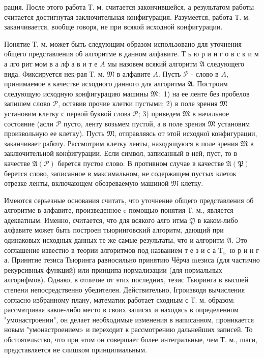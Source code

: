 \documentclass[10pt]{article}
\begin{document}
рация. После этого работа Т. м. считается закончившейся, а результатом работы считается достигнутая заключительная конфигурация. Разумеется, работа Т. м. заканчивается, вообще говоря, не при всякой исходной конфигурации.



Понятие Т. м. может быть следующим образом использовано для уточнения общего представления об алгоритме в данном алфавите. Т ь ю р и н г о в с к и м а лго рит мом в а лф а в и т е $A$ мы назовем всякий алгоритм $\mathfrak{A}$ следующего вида. Фиксируется нек-рая Т. м. $\mathfrak{M}$ в алфавите $A$. Пусть $\mathscr{P}$ - слово в $A$, принимаемое в качестве исходного данного для алгоритма $\mathfrak{A}$. Построим следующую исходную конфигурацию машины $\mathfrak{M}:$ 1) на ее ленте без пробелов запишем слово $\mathscr{P}$, оставив прочие клетки пустыми; 2) в поле зрения $\mathfrak{M}$ установим клетку с первой буквой слова $\mathscr{P}$; 3) приведем $\mathfrak{M}$ в начальное состояние (асли $\mathscr{P}$ пусто, ленту возьмем пустой, а в поле зрения $\mathfrak{M}$ установим произвольную ее клетку). Пусть $\mathfrak{M}$, отправляясь от этой исходної конфигурации, заканчивает работу. Рассмотрим клетку ленты, находящуюся в поле зрения $\mathfrak{M}$ в заключительной конфигурации. Если символ, записанный в ней, пуст, то в качестве $\mathfrak{A}(\mathscr{P})$ берется пустое слово. В противном случае в качестве $\mathfrak{A}(\mathfrak{P})$ берется слово, записанное в максимальном, не содержащем пустых клеток отрезке ленты, включающем обозреваемую машиной $\mathfrak{M}$ клетку.



Имеются серьезные основания считать, что уточнение общего представления об алгоритме в алфавите, произведенное $\mathrm{c}$ помощью понятия Т. м., является адекватным. Именно, считается, что для всякого алго итма $\mathfrak{Y}$ в каком-либо алфавите может быть построен тьюринговский алгоритм, дающий при одинаковых исходных данных те же самые результаты, что и алгоритм $\mathfrak{A}$. Это соглашение известно в теории алгоритмов под названием т е з и с а $\mathrm{T}_{\text {ь }}$ ю р и н г а. Принятие тезиса Тьюринга равносильно принятию Чёрча mезиса (для частично рекурсивных функций) или принципа нормализации (для нормальных алгорифмов). Однако, в отличие от этих последних, тезис Тьюринга в высшей степени непосредственно убедителен. Действительно, Ігроизводя вычисления согласно избранному плану, математик работает сходным с Т. м. образом: рассматривая какое-либо место в своих записях и находясь в определенном "умонастроении", он делает необходимые изменения в написанном, проникается новым "умонастроением» и переходит к рассмотрению дальнейших записей. То обстоятельство, что при этом он совершает более интегральные, чем Т. м., шаги, представляется не слишком принципиальным.
\end{document}
